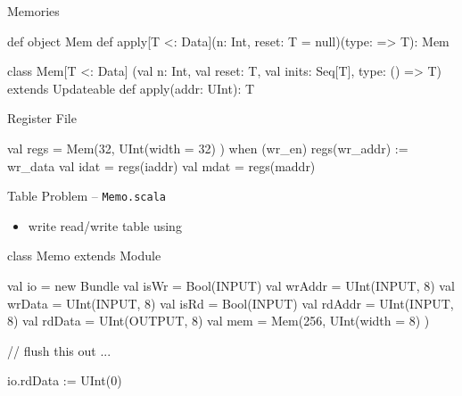 \documentclass[xcolor=pdflatex,dvipsnames,table]{beamer}
\begin{document}
\begin{frame}[fragile]{Memories}

\begin{scala}
def object Mem {
  def apply[T <: Data](n: Int, reset: T = null)(type: => T): Mem
}

class Mem[T <: Data]
    (val n: Int, val reset: T, val inits: Seq[T], type: () => T) 
      extends Updateable {
  def apply(addr: UInt): T
}
\end{scala}

\end{frame}

\begin{frame}[fragile]{Register File}

\begin{scala}
val regs = Mem(32, UInt(width = 32) )
when (wr_en) {
  regs(wr_addr) := wr_data
}
val idat = regs(iaddr)
val mdat = regs(maddr)
\end{scala}

\end{frame}

% 
% 

\begin{frame}[fragile]{Table Problem -- \tt Memo.scala}
\begin{itemize}
\item write read/write table using 
\end{itemize}
\begin{scala}
class Memo extends Module {
  val io = new Bundle {
    val isWr    = Bool(INPUT)
    val wrAddr  = UInt(INPUT, 8)
    val wrData  = UInt(INPUT, 8)
    val isRd    = Bool(INPUT)
    val rdAddr  = UInt(INPUT, 8)
    val rdData  = UInt(OUTPUT, 8)
  }
  val mem = Mem(256, UInt(width = 8) )

  // flush this out ...

  io.rdData := UInt(0)
}
\end{scala}
\end{frame}

% 
% 
\end{document}
